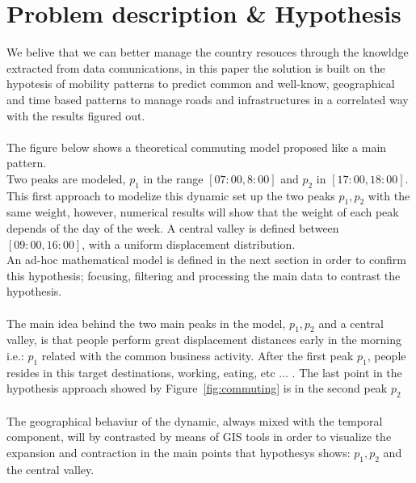 \newpage

\section{Problem description \& Hypothesis}
We belive that we can better manage  the country resouces through the knowldge extracted from data comunications, in this paper the solution is built on the hypotesis of mobility patterns to predict common and well-know, geographical and time based patterns to manage roads and infrastructures in a correlated way with the results figured out.
\\
\\
The figure below shows a theoretical commuting model proposed like a main pattern. 
\\
Two peaks are modeled, $p_1$ in the range $[07:00,8:00]$ and $p_2$ in $[17:00,18:00]$. This first approach to modelize this dynamic set up the two peaks $p_1, p_2$ with the same weight, however, numerical results will show that the weight of each peak depends of the day of the week. A central valley is defined between $[09:00, 16:00]$, with a uniform displacement distribution.
\\
An ad-hoc mathematical model is defined in the next section in order to confirm this hypothesis; focusing, filtering and processing the main data to contrast the hypothesis.
\\
\\
The main idea behind the two main peaks in the model, $p_1, p_2$ and a central valley, is that people perform great displacement distances early in the morning i.e.: $p_1$ related with the common business activity. After the first peak $p_1$, people resides in this target destinations, working, eating, etc ... . The last point in the hypothesis approach showed by Figure~\ref{fig:commuting}  is in the second peak $p_2$
\\
\\
The geographical behaviur of the dynamic, always mixed with the temporal component, will by contrasted by means of GIS tools in order to visualize the expansion and contraction in the main points that hypothesys shows: $p_1, p_2$ and the central valley.


